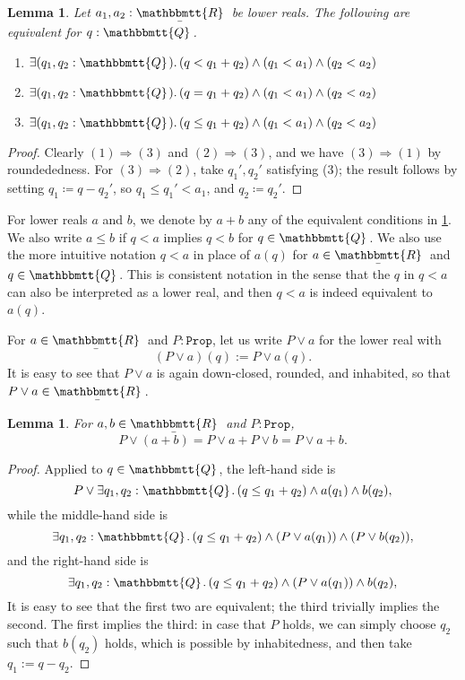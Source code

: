 \documentclass[11pt, oneside, article]{memoir}
\theoremstyle{plain}
\newtheorem{lemma}[theorem]{Lemma}
\theoremstyle{definition}
\theoremstyle{remark}
\newcommand{\const}[1]{\mathtt{#1}}
\newcommand{\ubar}[1]{\underaccent{\bar}{#1}}
\newcommand{\internal}[1]{\raisebox{-.03ex}{$\mathbbmtt{#1}$}}
\newcommand{\hs}{\hspace{1.1pt}}
\newcommand{\tQQ}{\internal{Q}\hs}
\newcommand{\tRR}{\internal{R}\hs}
\newcommand{\tLR}{\ubar{\tRR}\hs}
\newcommand{\Prop}{\const{Prop}}
\newcommand{\imp}{\Rightarrow}
\begin{document}
\begin{lemma}\label{lemma.plus_def}
Let $a_1,a_2:\tLR$ be lower reals. The following are equivalent for $q:\tQQ$.
\begin{enumerate}
	\item $\exists(q_1,q_2:\tQQ)\ldotp (q<q_1+q_2)\wedge(q_1<a_1)\wedge(q_2<a_2)$
	\item $\exists(q_1,q_2:\tQQ)\ldotp (q=q_1+q_2)\wedge(q_1<a_1)\wedge(q_2<a_2)$
	\item $\exists(q_1,q_2:\tQQ)\ldotp (q\leq q_1+q_2)\wedge(q_1<a_1)\wedge(q_2<a_2)$
\end{enumerate}
\end{lemma}
\begin{proof}
Clearly $(1)\imp(3)$ and $(2)\imp(3)$, and we have $(3)\imp(1)$ by roundededness. For $(3)\imp(2)$, take $q_1',q_2'$ satisfying (3); the result follows by setting $q_1\coloneqq q-q_2'$, so $q_1\leq q_1'<a_1$, and $q_2\coloneqq q_2'$.
\end{proof}
For lower reals $a$ and $b$, we denote by $a+b$ any of the equivalent conditions in \cref{lemma.plus_def}. We also write $a\leq b$ if $q < a$ implies $q < b$ for $q\in\tQQ$. We also use the more intuitive notation $q < a$ in place of $a(q)$ for $a\in\tLR$ and $q\in\tQQ$. This is consistent notation in the sense that the $q$ in $q < a$ can also be interpreted as a lower real, and then $q < a$ is indeed equivalent to $a(q)$.

For $a\in\tLR$ and $P : \Prop$, let us write $P \lor a$ for the lower real with
\[
	(P \lor a)(q) := P \lor a(q).
\]
It is easy to see that $P \lor a$ is again down-closed, rounded, and inhabited, so that $P \lor a \in \tLR$. 

\begin{lemma}
	\label{lem.or_add_LR}
	For $a,b\in\tLR$ and $P : \Prop$,
	\[
		P \lor (a + b) = P \lor a + P \lor b = P \lor a + b.
	\]
\end{lemma}

\begin{proof}
	Applied to $q \in \tQQ$, the left-hand side is
	\[
		P \lor \exists q_1, q_2  : \tQQ \ldotp (q \leq q_1 + q_2) \land a(q_1) \land b(q_2),
	\]
	while the middle-hand side is
	\[
		\exists q_1, q_2  : \tQQ \ldotp (q \leq q_1 + q_2) \land (P \lor a(q_1)) \land (P \lor b(q_2)),
	\]
	and the right-hand side is
	\[
		\exists q_1, q_2  : \tQQ \ldotp (q \leq q_1 + q_2) \land (P \lor a(q_1)) \land b(q_2),
	\]
	It is easy to see that the first two are equivalent; the third trivially implies the second. The first implies the third: in case that $P$ holds, we can simply choose $q_2$ such that $b(q_2)$ holds, which is possible by inhabitedness, and then take $q_1 := q - q_2$.
\end{proof}
\end{document}
